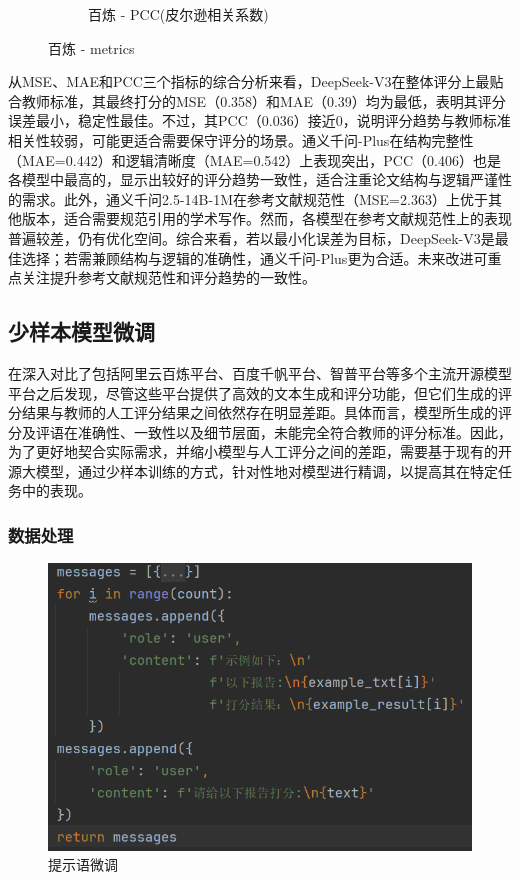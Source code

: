 \documentclass{article}
\begin{document}
\begin{figure}[h!]
\begin{subfigure}{0.3\linewidth}
		\caption{百炼 - PCC(皮尔逊相关系数)}
		\label{fig:bailian-PCC}
	\end{subfigure}
	\caption{百炼 - metrics}
		\label{fig:bailian-metrics}
\end{figure}

从MSE、MAE和PCC三个指标的综合分析来看，DeepSeek-V3在整体评分上最贴合教师标准，其最终打分的MSE（0.358）和MAE（0.39）均为最低，表明其评分误差最小，稳定性最佳。不过，其PCC（0.036）接近0，说明评分趋势与教师标准相关性较弱，可能更适合需要保守评分的场景。通义千问-Plus在结构完整性（MAE=0.442）和逻辑清晰度（MAE=0.542）上表现突出，PCC（0.406）也是各模型中最高的，显示出较好的评分趋势一致性，适合注重论文结构与逻辑严谨性的需求。此外，通义千问2.5-14B-1M在参考文献规范性（MSE=2.363）上优于其他版本，适合需要规范引用的学术写作。然而，各模型在参考文献规范性上的表现普遍较差，仍有优化空间。综合来看，若以最小化误差为目标，DeepSeek-V3是最佳选择；若需兼顾结构与逻辑的准确性，通义千问-Plus更为合适。未来改进可重点关注提升参考文献规范性和评分趋势的一致性。 

\subsection{少样本模型微调}

在深入对比了包括阿里云百炼平台、百度千帆平台、智普平台等多个主流开源模型平台之后发现，尽管这些平台提供了高效的文本生成和评分功能，但它们生成的评分结果与教师的人工评分结果之间依然存在明显差距。具体而言，模型所生成的评分及评语在准确性、一致性以及细节层面，未能完全符合教师的评分标准。因此，为了更好地契合实际需求，并缩小模型与人工评分之间的差距，需要基于现有的开源大模型，通过少样本训练的方式，针对性地对模型进行精调，以提高其在特定任务中的表现。

\subsubsection{数据处理}

\begin{figure}
    \centering
    \includegraphics[width=1\linewidth]{img/few-shot.png}
    \caption{提示语微调}
    \label{fig:few-shot}
\end{figure}
\end{document}
